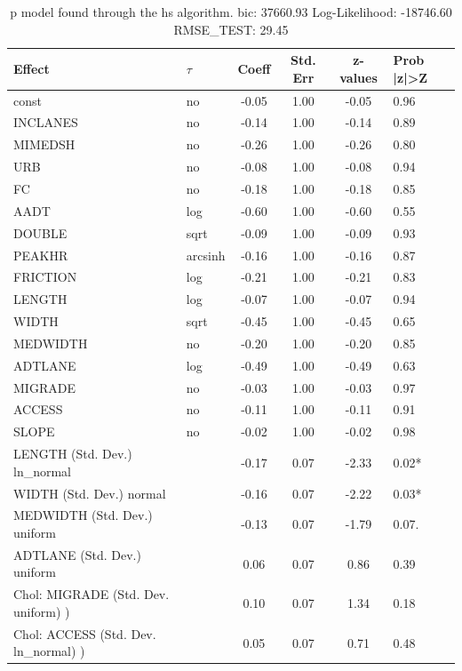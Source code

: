 \begin{table}
	\caption{p model found through the hs algorithm. bic: 37660.93 Log-Likelihood: -18746.60 RMSE_TEST: 29.45}
	\begin{center}
		\begin{tabular}{|l|l|c|c|c|l|}
			\hline
			Effect & $\tau$ & Coeff & Std. Err & z-values & Prob |z|>Z \\
			\hline
			const & no & -0.05 & 1.00 & -0.05 & 0.96 \\
			\hline
			INCLANES & no & -0.14 & 1.00 & -0.14 & 0.89 \\
			\hline
			MIMEDSH & no & -0.26 & 1.00 & -0.26 & 0.80 \\
			\hline
			URB & no & -0.08 & 1.00 & -0.08 & 0.94 \\
			\hline
			FC & no & -0.18 & 1.00 & -0.18 & 0.85 \\
			\hline
			AADT & log & -0.60 & 1.00 & -0.60 & 0.55 \\
			\hline
			DOUBLE & sqrt & -0.09 & 1.00 & -0.09 & 0.93 \\
			\hline
			PEAKHR & arcsinh & -0.16 & 1.00 & -0.16 & 0.87 \\
			\hline
			FRICTION & log & -0.21 & 1.00 & -0.21 & 0.83 \\
			\hline
			LENGTH & log & -0.07 & 1.00 & -0.07 & 0.94 \\
			\hline
			WIDTH & sqrt & -0.45 & 1.00 & -0.45 & 0.65 \\
			\hline
			MEDWIDTH & no & -0.20 & 1.00 & -0.20 & 0.85 \\
			\hline
			ADTLANE & log & -0.49 & 1.00 & -0.49 & 0.63 \\
			\hline
			MIGRADE & no & -0.03 & 1.00 & -0.03 & 0.97 \\
			\hline
			ACCESS & no & -0.11 & 1.00 & -0.11 & 0.91 \\
			\hline
			SLOPE & no & -0.02 & 1.00 & -0.02 & 0.98 \\
			\hline
			LENGTH (Std. Dev.) ln_normal &  & -0.17 & 0.07 & -2.33 & 0.02* \\
			\hline
			WIDTH (Std. Dev.) normal &  & -0.16 & 0.07 & -2.22 & 0.03* \\
			\hline
			MEDWIDTH (Std. Dev.) uniform &  & -0.13 & 0.07 & -1.79 & 0.07. \\
			\hline
			ADTLANE (Std. Dev.) uniform &  & 0.06 & 0.07 & 0.86 & 0.39 \\
			\hline
			 Chol: MIGRADE (Std. Dev. uniform) ) &  & 0.10 & 0.07 & 1.34 & 0.18 \\
			\hline
			 Chol: ACCESS (Std. Dev. ln_normal) ) &  & 0.05 & 0.07 & 0.71 & 0.48 \\

\end{tabular}
\end{center}
\end{table}
